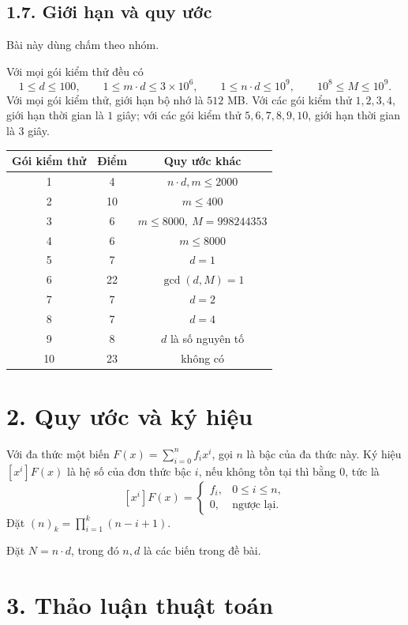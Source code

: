 \documentclass[11pt]{article}
\begin{document}
\subsection*{1.7. Giới hạn và quy ước}

Bài này dùng chấm theo nhóm.

Với mọi gói kiểm thử đều có
\[
  1\le d\le100,\qquad 1\le m\cdot d\le3\times10^6,\qquad
  1\le n\cdot d\le10^9,\qquad 10^8\le M\le10^9.
\]
Với mọi gói kiểm thử, giới hạn bộ nhớ là \(512\) MB. Với các gói kiểm thử
\(1,2,3,4\), giới hạn thời gian là \(1\) giây; với các gói kiểm thử
\(5,6,7,8,9,10\), giới hạn thời gian là \(3\) giây.

\begin{center}
\begin{tabular}{c c c}
\textbf{Gói kiểm thử} & \textbf{Điểm} & \textbf{Quy ước khác} \\
\hline
1 & 4 & \(n\cdot d,m\le2000\) \\
2 & 10 & \(m\le400\) \\
3 & 6 & \(m\le8000,\ M=998244353\) \\
4 & 6 & \(m\le8000\) \\
5 & 7 & \(d=1\) \\
6 & 22 & \(\gcd(d,M)=1\) \\
7 & 7 & \(d=2\) \\
8 & 7 & \(d=4\) \\
9 & 8 & \(d\) là số nguyên tố \\
10 & 23 & không có \\
\end{tabular}
\end{center}

\section*{2. Quy ước và ký hiệu}

Với đa thức một biến \(F(x)=\sum_{i=0}^{n}f_i x^i\), gọi \(n\) là bậc của đa
thức này. Ký hiệu \([x^i]F(x)\) là hệ số của đơn thức bậc \(i\), nếu không
tồn tại thì bằng \(0\), tức là
\[
  [x^i]F(x)=
  \begin{cases}
    f_i, & 0\le i\le n,\\
    0, & \text{ngược lại}.
  \end{cases}
\]
Đặt \((n)_k=\prod_{i=1}^{k}(n-i+1)\).

Đặt \(N=n\cdot d\), trong đó \(n,d\) là các biến trong đề bài.

\section*{3. Thảo luận thuật toán}
\end{document}
